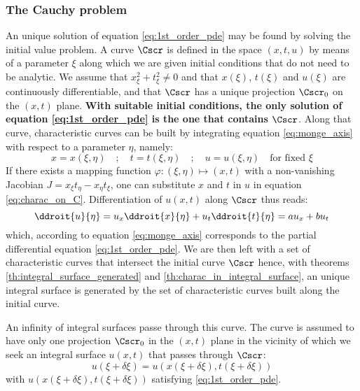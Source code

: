 \subsubsection*{The Cauchy problem}
An unique solution of equation \ref{eq:1st_order_pde} may be found by solving the initial value problem. A curve $\Cscr$ is defined in the space $(x,t,u)$ by means of a parameter $\xi$ along which we are given initial conditions that do not need to be analytic. We assume that $x_\xi^2 + t_\xi^2 \neq 0$ and that $x(\xi)$, $t(\xi)$ and $u(\xi)$ are continuously differentiable, and that $\Cscr$ has a unique projection $\Cscr_0$ on the $(x,t)$ plane. \textbf{With suitable initial conditions, the only solution of equation \ref{eq:1st_order_pde} is the one that contains $\Cscr$}. %
Along that curve, characteristic curves can be built by integrating equation \ref{eq:monge_axis} with respect to a parameter $\eta$, namely:
\begin{equation}
  \label{eq:charac_on_C}
  x=x(\xi,\eta) \quad ; \quad t=t(\xi,\eta) \quad ; \quad u=u(\xi,\eta) \quad \text{for fixed } \xi
\end{equation}
If there exists a mapping function $\varphi:(\xi,\eta) \mapsto (x,t)$ with a non-vanishing Jacobian $J=x_\xi t_\eta - x_\eta t_\xi$, one can substitute $x$ and $t$ in $u$ in equation \ref{eq:charac_on_C}. 
Differentiation of $u(x,t)$ along $\Cscr$ thus reads:
\begin{equation*}
  \ddroit{u}{\eta}= u_x \ddroit{x}{\eta} + u_t \ddroit{t}{\eta} =  a u_x + b u_t
\end{equation*}
which, according to equation \ref{eq:monge_axis} corresponds to the partial differential equation \ref{eq:1st_order_pde}. We are then left with a set of characteristic curves that intersect the initial curve $\Cscr$ hence, with theorems \ref{th:integral_surface_generated} and \ref{th:charac_in_integral_surface}, an unique integral surface is generated by the set of characteristic curves built along the initial curve.

An infinity of integral surfaces passe through this curve. The curve  is assumed to have only one projection $\Cscr_0$ in the $(x,t)$ plane in the vicinity of which we seek an integral surface $u(x,t)$ that passes through $\Cscr$:
\begin{equation}
  \label{eq:IVP_char}
  u(\xi + \delta\xi) = u(x(\xi + \delta\xi),t(\xi + \delta\xi))
\end{equation}
with $u(x(\xi + \delta\xi),t(\xi + \delta\xi))$ satisfying \ref{eq:1st_order_pde}.

